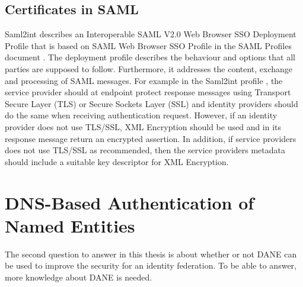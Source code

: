 \subsection{Certificates in SAML}

Saml2int \cite{website:saml2int} describes an Interoperable SAML V2.0 Web Browser SSO Deployment Profile that is based on 
SAML Web Browser SSO Profile in the SAML Profiles document \cite{pdf:oasis-open-profiles}. 
The deployment profile describes the behaviour and options that all parties are supposed to follow. 
Furthermore, it addresses the content, exchange and processing of SAML messages.
For example in the Saml2int profile \cite{website:saml2int}, the service provider should at endpoint protect response 
messages using Transport Secure Layer (TLS) or Secure Sockets Layer (SSL)  and identity providers should do the same when receiving 
authentication request. 
However, if an identity provider does not use TLS/SSL, XML Encryption should be used and in its response message return an encrypted assertion. 
In addition, if service providers does not use TLS/SSL as recommended, then the service providers metadata should include a suitable key descriptor for XML Encryption.


\section{DNS-Based Authentication of Named Entities} 
The second question to answer in this thesis is about whether or not DANE can be used to improve the security for an identity federation. To be able to answer, more knowledge about DANE is needed.

